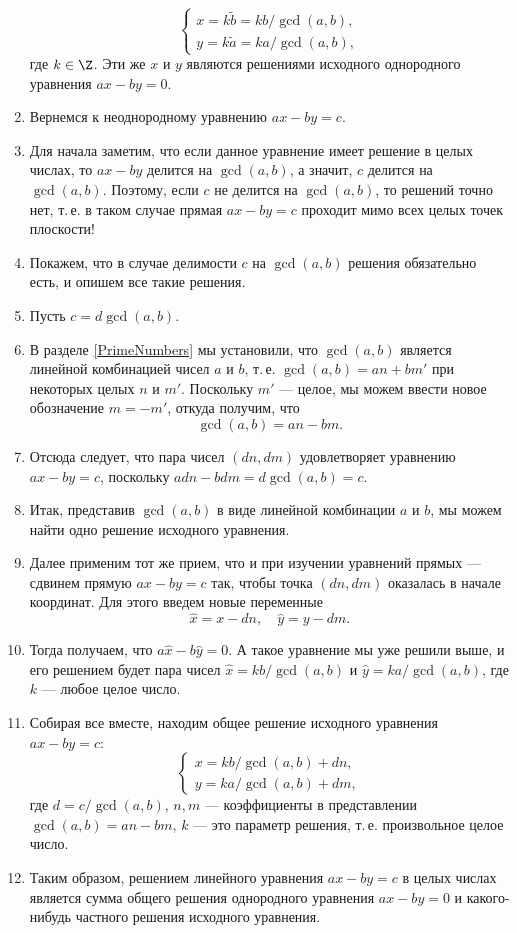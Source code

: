 \begin{enumerate}
$$
\begin{cases}
x  =k\tilde b=kb/\gcd(a,b), \\
y  =k\tilde a=ka/\gcd(a,b),
\end{cases}
$$
где $k\in\Z$. Эти же $x$ и $y$ являются решениями исходного однородного уравнения $ax-by=0$.
\item Вернемся к неоднородному уравнению $ax-by=c$.
\item Для начала заметим, что если данное уравнение имеет решение в целых числах, то $ax-by$ делится на $\gcd(a,b)$, а значит, $c$ делится на $\gcd(a,b)$. Поэтому, если $c$ не делится на $\gcd(a,b)$, то решений точно нет, т.\,е. в таком случае прямая $ax-by=c$ проходит мимо всех целых точек плоскости!
\item Покажем, что в случае делимости $c$ на $\gcd(a,b)$ решения обязательно есть, и опишем все такие решения.
\item Пусть $c=d\gcd(a,b)$.
\item В разделе \ref{PrimeNumbers} мы установили, что $\gcd(a,b)$ является линейной комбинацией чисел $a$ и $b$, т.\,е. $\gcd(a,b) = an+bm'$ при некоторых целых $n$ и $m'$. Поскольку $m'$ --- целое, мы можем ввести новое обозначение $m=-m'$, откуда получим, что
$$
\gcd(a,b) = an-bm.
$$
\item Отсюда следует, что пара чисел $(dn,dm)$ удовлетворяет уравнению $ax-by=c$, поскольку
$adn-bdm=d\gcd(a,b)=c$.
\item Итак, представив $\gcd(a,b)$ в виде линейной комбинации $a$ и $b$, мы можем найти одно решение исходного уравнения.
\item Далее применим тот же прием, что и при изучении уравнений прямых --- сдвинем прямую $ax-by=c$ так, чтобы точка $(dn,dm)$ оказалась в начале координат. Для этого введем новые переменные
$$
\hat x = x-dn,\quad \hat y = y-dm.
$$
\item Тогда получаем, что $a\hat x-b\hat y = 0$. А такое уравнение мы уже решили выше, и его решением будет пара чисел $\hat x = kb/\gcd(a,b)$ и $\hat y = ka/\gcd(a,b)$, где $k$ --- любое целое число.
\item Собирая все вместе, находим общее решение исходного уравнения $ax-by=c$:
$$
\begin{cases}
x  = kb/\gcd(a,b) + dn, \\
y  = ka/\gcd(a,b) + dm,
\end{cases}
$$
где $d=c/\gcd(a,b)$, $n,m$ --- коэффициенты в представлении $\gcd(a,b)=an-bm$, $k$ --- это параметр решения, т.\,е. произвольное целое число.
\item Таким образом, решением линейного уравнения $ax-by=c$ в целых числах является сумма общего решения однородного уравнения $ax-by=0$ и какого-нибудь частного решения исходного уравнения.


\end{enumerate}

